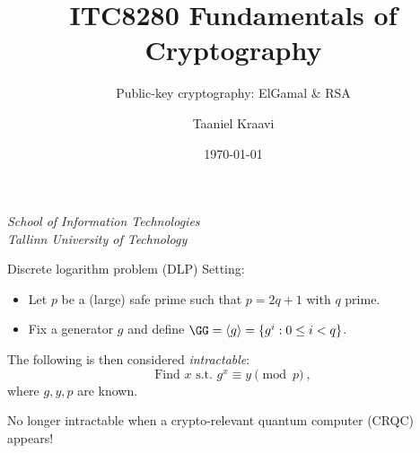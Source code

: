 \graphicspath{ {../../images/} }
\usetikzlibrary{external}

\usepackage{fancyvrb}

\title{ITC8280 Fundamentals of Cryptography}
\subtitle{Public-key cryptography: ElGamal \& RSA}
\date{\today}
\author{Taaniel Kraavi}
\institute%
{%
  \textit{School of Information Technologies}\\
  \textit{Tallinn University of Technology}
}


\begin{frame}
  \titlepage
\end{frame}

\begin{frame}{Discrete logarithm problem (DLP)}
  Setting:
  \begin{itemize}[<+(1)->]
    \item Let $p$ be a (large) safe prime such that $p = 2q + 1$ with $q$ prime.
    \item Fix a generator $g$ and define $\GG = \langle g \rangle = \{g^i :0 \le i < q\}$.
  \end{itemize}

  \vspace*{1em}

  \pause
  The following is then considered \emph{intractable}:
  \[
    \text{Find $x$ s.t. } g^x \equiv y \pmod{p}\ ,
  \]
  where $g, y, p$ are known.

  \pause
  No longer intractable when a crypto-relevant quantum computer (CRQC) appears!
\end{frame}

